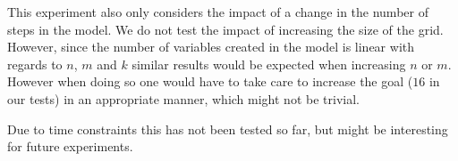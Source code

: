 \documentclass[12pt]{article}
\begin{document}
This experiment also only considers the impact of a change in the number of
steps in the model. We do not test the impact of increasing the size of the
grid. However, since the number of variables created in the model is linear with
regards to $n$, $m$ and $k$ similar results would be expected when increasing
$n$ or $m$. However when doing so one would have to take care to increase the
goal ($16$ in our tests) in an appropriate manner, which might not be 
trivial.

Due to time constraints this has not been tested so far, but might be interesting
for future experiments.
\end{document}
